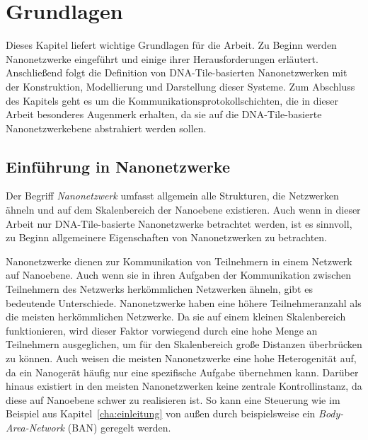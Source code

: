 \chapter{Grundlagen}
\label{cha:grundlagen}

Dieses Kapitel liefert wichtige Grundlagen für die Arbeit. 
Zu Beginn werden Nanonetzwerke eingeführt und einige ihrer Herausforderungen erläutert. 
Anschließend folgt die Definition von DNA-Tile-basierten Nanonetzwerken mit der Konstruktion, Modellierung und Darstellung dieser Systeme.
Zum Abschluss des Kapitels geht es um die Kommunikationsprotokollschichten, die in dieser Arbeit besonderes Augenmerk erhalten, da sie auf die DNA-Tile-basierte Nanonetzwerkebene abstrahiert werden sollen.

\section{Einführung in Nanonetzwerke}

Der Begriff \emph{Nanonetzwerk} umfasst allgemein alle Strukturen, die Netzwerken ähneln und auf dem Skalenbereich der Nanoebene existieren. Auch wenn in dieser Arbeit nur DNA-Tile-basierte Nanonetzwerke betrachtet werden, ist es sinnvoll, zu Beginn allgemeinere Eigenschaften von Nanonetzwerken zu betrachten.

Nanonetzwerke dienen zur Kommunikation von Teilnehmern in einem Netzwerk auf Nanoebene. Auch wenn sie in ihren Aufgaben der Kommunikation zwischen Teilnehmern des Netzwerks herkömmlichen Netzwerken ähneln, gibt es bedeutende Unterschiede.
Nanonetzwerke haben eine höhere Teilnehmeranzahl als die meisten herkömmlichen Netzwerke. 
Da sie auf einem kleinen Skalenbereich funktionieren, wird dieser Faktor vorwiegend durch eine hohe Menge an Teilnehmern ausgeglichen, um für den Skalenbereich große Distanzen überbrücken zu können.
Auch weisen die meisten Nanonetzwerke eine hohe Heterogenität auf, da ein Nanogerät häufig nur eine spezifische Aufgabe übernehmen kann. Darüber hinaus existiert in den meisten Nanonetzwerken keine zentrale Kontrollinstanz, da diese auf Nanoebene schwer zu realisieren ist. So kann eine Steuerung wie im Beispiel aus Kapitel~\ref{cha:einleitung} von außen durch beispielsweise ein \emph{Body-Area-Network} (BAN) geregelt werden.\cite{buether2017formal}

